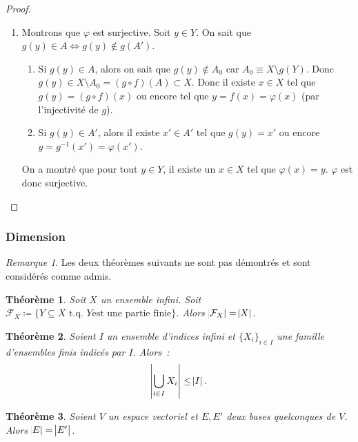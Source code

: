 \documentclass{article}
\newcommand{\tq}{\textrm{ t.q. }}
\newtheorem{thm}{Théorème}[section]
\theoremstyle{definition}
\theoremstyle{remark}
\newtheorem*{rmq}{Remarque}
\begin{document}
\begin{proof}
\begin{enumerate}
			\item Montrons que $\varphi$ est surjective. Soit $y \in Y$. On sait que $g(y) \in A \iff g(y) \not \in g(A')$.
			\begin{enumerate}
				\item Si $g(y) \in A$, alors on sait que $g(y) \not \in A_0$ car $A_0 \equiv X \setminus g(Y)$. Donc $g(y) \in X \setminus A_0 = (g \circ f)(A) \subset X$.
				Donc il existe $x \in X$ tel que $g(y) = (g \circ f)(x)$ ou encore tel que $y = f(x) = \varphi(x)$ (par l'injectivité de $g$).
				\item Si $g(y) \in A'$, alors il existe $x' \in A'$ tel que $g(y) = x'$ ou encore $y = g^{-1}(x') = \varphi(x')$.
			\end{enumerate}
			On a montré que pour tout $y \in Y$, il existe un $x \in X$ tel que $\varphi(x) = y$. $\varphi$ est donc surjective.
		\end{enumerate}
		\end{proof}

		\subsubsection{Dimension}
		\begin{rmq} Les deux théorèmes suivants ne sont pas démontrés et sont considérés comme admis. \end{rmq}

		\begin{thm}\label{cardPartiesFinies} Soit $X$ un ensemble infini. Soit $\mathcal F_X \coloneqq \{Y \subseteq X \tq Y \text {est une partie finie}\}$.
		Alors $\abs {\mathcal F_X} = \abs X$. \end{thm}

		\begin{thm}\label{unionEnsFinisIndicésInfini} Soient $I$ un ensemble d'indices infini et $\{X_i\}_{i \in I}$ une famille d'ensembles finis indicés par $I$.
		Alors~: \[\abs {\bigcup_{i \in I}X_i} \leq \abs I.\] \end{thm}

		\begin{thm} Soient $V$ un espace vectoriel et $E, E'$ deux bases quelconques de $V$. Alors $\abs E = \abs {E'}$. \end{thm}
\end{document}
